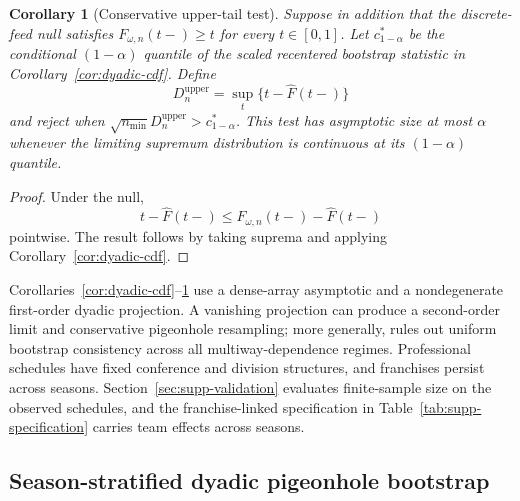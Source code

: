 \documentclass[12pt,letterpaper]{article}
\theoremstyle{plain}
\newtheorem{corollary}[theorem]{Corollary}
\begin{document}
\begin{corollary}[Conservative upper-tail test] \label{cor:conservative-test}
Suppose in addition that the discrete-feed null satisfies $F_{\omega,n}(t-)\ge t$ for every $t\in[0,1]$.
Let $c_{1-\alpha}^*$ be the conditional $(1-\alpha)$ quantile of the scaled recentered bootstrap statistic in Corollary~\ref{cor:dyadic-cdf}.
Define
\[
D_n^{\mathrm{upper}}=\sup_t\{t-\widehat F(t-)\}
\]
and reject when $\sqrt{n_{\min}}D_n^{\mathrm{upper}}>c_{1-\alpha}^*$.
This test has asymptotic size at most $\alpha$ whenever the limiting supremum distribution is continuous at its $(1-\alpha)$ quantile.
\end{corollary}

\begin{proof}
Under the null,
\[
t-\widehat F(t-)
\le F_{\omega,n}(t-)-\widehat F(t-)
\]
pointwise.
The result follows by taking suprema and applying Corollary~\ref{cor:dyadic-cdf}.
\end{proof}

Corollaries~\ref{cor:dyadic-cdf}--\ref{cor:conservative-test} use a dense-array asymptotic and a nondegenerate first-order dyadic projection.
A vanishing projection can produce a second-order limit and conservative pigeonhole resampling; more generally, \citet{Menzel2021} rules out uniform bootstrap consistency across all multiway-dependence regimes.
Professional schedules have fixed conference and division structures, and franchises persist across seasons.
Section~\ref{sec:supp-validation} evaluates finite-sample size on the observed schedules, and the franchise-linked specification in Table~\ref{tab:supp-specification} carries team effects across seasons.

\subsection{Season-stratified dyadic pigeonhole bootstrap}
\end{document}
